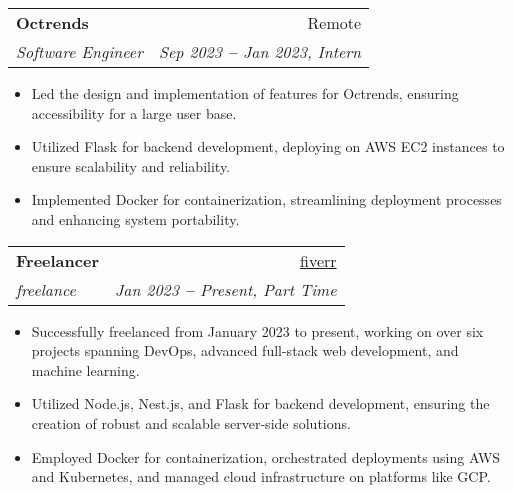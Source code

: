 \documentclass[letterpaper,11pt]{article}
\makeatletter
\newcommand{\resumeItem}[1]{
  \item\small{
    {#1 \vspace{-2pt}}
  }
}
\newcommand{\resumeSubheading}[4]{
  \vspace{-2pt}\item
    \begin{tabular*}{0.97\textwidth}[t]{l@{\extracolsep{\fill}}r}
      \textbf{#1} & #2 \\
      \textit{\small#3} & \textit{\small #4} \\
    \end{tabular*}\vspace{-7pt}
}
\newcommand{\resumeItemListStart}{\begin{itemize}}
\newcommand{\resumeItemListEnd}{\end{itemize}\vspace{-5pt}}
\makeatother
\begin{document}
    \resumeSubheading
      {Octrends}{Remote}
      {Software Engineer}{Sep 2023 \textbf{--} Jan 2023, Intern}
        \resumeItemListStart
            \resumeItem{Led the design and implementation of features for Octrends, ensuring accessibility for a large user base.}
            \resumeItem{Utilized Flask for backend development, deploying on AWS EC2 instances to ensure scalability and reliability.}
            \resumeItem{Implemented Docker for containerization, streamlining deployment processes and enhancing system portability.}
        \resumeItemListEnd
            
      



    \resumeSubheading
      {Freelancer}{\href{https://www.fiverr.com/anshuvermaa}{\color{blue}fiverr}}
      {freelance}{Jan 2023 \textbf{--} Present, Part Time}
        \resumeItemListStart
            \resumeItem{Successfully freelanced from January 2023 to present, working on over six projects spanning DevOps, advanced full-stack web development, and machine learning.}
            \resumeItem{Utilized Node.js, Nest.js, and Flask for backend development, ensuring the creation of robust and scalable server-side solutions.}
            \resumeItem{Employed Docker for containerization, orchestrated deployments using AWS and Kubernetes, and managed cloud infrastructure on platforms like GCP.}
        \resumeItemListEnd
    
\end{document}
